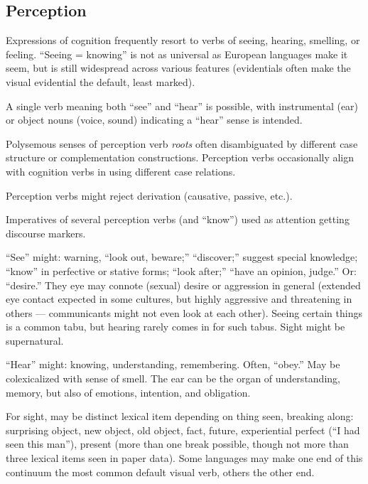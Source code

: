\documentclass[11pt]{article}
\begin{document}
\subsection{Perception}
Expressions of cognition frequently resort to verbs of seeing,
hearing, smelling, or feeling.  ``Seeing = knowing'' is not as
universal as European languages make it seem, but is still widespread
across various features (evidentials often make the visual evidential
the default, least marked).

A single verb meaning both ``see'' and ``hear'' is possible, with
instrumental (ear) or object nouns (voice, sound) indicating a
``hear'' sense is intended.

Polysemous senses of perception verb \textit{roots} often
disambiguated by different case structure or complementation
constructions.  Perception verbs occasionally align with cognition
verbs in using different case relations.

Perception verbs might reject derivation (causative, passive, etc.).

Imperatives of several perception verbs (and ``know'') used as
attention getting discourse markers.

``See'' might: warning, ``look out, beware;'' ``discover;'' suggest
special knowledge; ``know'' in perfective or stative forms; ``look
after;'' ``have an opinion, judge.'' Or: ``desire.''  They eye may
connote (sexual) desire or aggression in general (extended eye contact
expected in some cultures, but highly aggressive and threatening in
others — communicants might not even look at each other).  Seeing
certain things is a common tabu, but hearing rarely comes in for such
tabus.  Sight might be supernatural.

``Hear'' might: knowing, understanding, remembering.  Often, ``obey.''
May be colexicalized with sense of smell.  The ear can be the organ of
understanding, memory, but also of emotions, intention, and obligation.

For sight, may be distinct lexical item depending on thing seen,
breaking along: surprising object, new object, old object, fact,
future, experiential perfect (``I had seen this man''), present (more
than one break possible, though not more than three lexical items seen
in paper data).  Some languages may make one end of this continuum the
most common default visual verb, others the other end.
\end{document}
